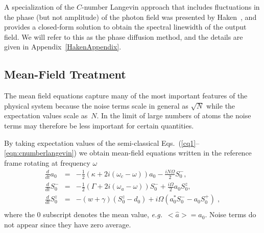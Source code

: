 \documentclass[aps,
twocolumn,
showpacs,
superscriptaddress,groupedaddress]{revtex4}
\begin{document}
A specialization of the $C$-number Langevin approach that includes
fluctuations in the phase (but not amplitude) of the photon field was
presented by Haken~\cite{HakenLaserBook}, and provides a closed-form
solution to obtain the spectral linewidth of the output field. We will
refer to this as the phase diffusion method, and the details are given
in Appendix~\ref{HakenAppendix}.

\subsection{Mean-Field Treatment}
\label{MFE}

The mean field equations capture many of the most important features
of the physical system because the noise terms scale in general as
$\sqrt{N}$ while the expectation values scale as~$N$.  In the limit of
large numbers of atoms the noise terms may therefore be less important
for certain quantities.

By taking expectation values of the semi-classical
Eqs.~(\ref{cq1}--\ref{eqn:cnumberlangevin}) we obtain mean-field
equations written in the reference frame rotating at frequency
$\omega$
\begin{eqnarray}
\frac{d}{dt} a_0&=& -\frac{1}{2} (\kappa +2i(\omega_c-\omega)) a_0
-\frac{i N \Omega}{2} S_0^{-},
\label{La0}\\
\frac{d}{dt} S_0^{-} &=&
-\frac{1}{2} \left(\Gamma +2 i (\omega_a-\omega) \right)  S_0^{-}
+\frac{i \Omega}{2} a_0 S_0^{z},\\
\frac{d}{dt} S_0^{z} &=& -(w+\gamma)\left( S_0^{z} - d_0\right)
+i\Omega \left( a_0^{*} S_0^{-} - a_0 S_0^{+} \right)\;,\nonumber\\
\label{Lsz0}
\end{eqnarray}
where the $0$ subscript denotes the mean value, {\em e.g.}\
$\bigl< \hat{a} \bigr>=a_0$. Noise terms do not appear since they have
zero average.  
\end{document}
